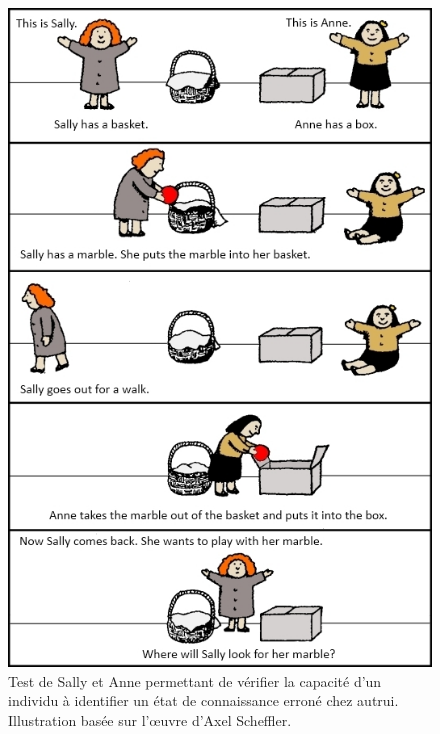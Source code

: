 \documentclass[a4paper,11pt,twoside]{StyleThese}
\begin{document}
\begin{figure}[ht!]
 \centering
  \includegraphics[width=0.89\linewidth]{./img/sally.jpg} 
  \caption {Test de Sally et Anne permettant de vérifier la capacité d'un individu à identifier un état de connaissance erroné chez autrui. Illustration basée sur l'œuvre d'Axel
Scheffler.}
  \label{fig:sallyAndAnne}
\end{figure}


\end{document}
